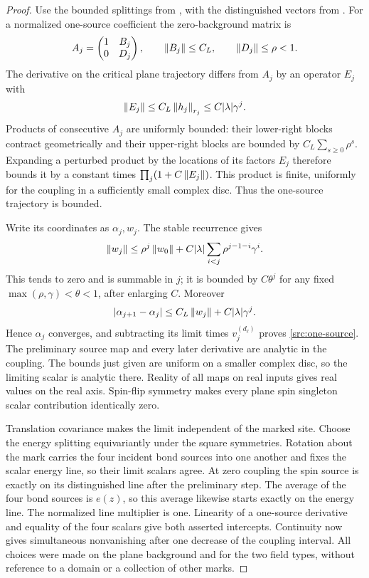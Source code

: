 \begin{proof}
Use the bounded splittings from , with the distinguished
vectors from . For a normalized one-source coefficient the
zero-background matrix is
\[
 A_j=
 \begin{pmatrix}1&B_j\\0&D_j\end{pmatrix},
 \qquad \left\|B_j\right\|\leq C_L,
 \qquad \left\|D_j\right\|\leq\rho<1.
\]
The derivative on the critical plane trajectory differs from $A_j$ by an
operator $E_j$ with
\[
 \left\|E_j\right\|\leq C_L\left\|h_j\right\|_{r_j}
                  \leq C|\lambda|\gamma^j.
\]
Products of consecutive $A_j$ are uniformly bounded: their lower-right
blocks contract geometrically and their upper-right blocks are bounded
by $C_L\sum_{s\geq0}\rho^s$. Expanding a perturbed product by the locations
of its factors $E_j$ therefore bounds it by a constant times
$\prod_j(1+C\left\|E_j\right\|)$. This product is finite, uniformly for the
coupling in a sufficiently small complex disc. Thus the one-source
trajectory is bounded.

Write its coordinates as $\alpha_j,w_j$. The stable recurrence gives
\[
 \left\|w_j\right\|
 \leq \rho^j\left\|w_0\right\|
       +C|\lambda|\sum_{i<j}\rho^{j-1-i}\gamma^i.
\]
This tends to zero and is summable in $j$; it is bounded by $C\theta^j$
for any fixed $\max(\rho,\gamma)<\theta<1$, after enlarging $C$.
Moreover
\[
 |\alpha_{j+1}-\alpha_j|
 \leq C_L\left\|w_j\right\|+C|\lambda|\gamma^j.
\]
Hence $\alpha_j$ converges, and subtracting its limit times
$v_j^{(d_\ell)}$ proves \eqref{src:one-source}. The preliminary source
map and every later derivative are analytic in the coupling. The bounds
just given are uniform on a smaller complex disc, so the limiting scalar
is analytic there. Reality of all maps on real inputs gives real values
on the real axis. Spin-flip symmetry makes every plane spin singleton
scalar contribution identically zero.

Translation covariance makes the limit independent of the marked site.
Choose the energy splitting equivariantly under the square symmetries.
Rotation about the mark carries the four incident bond sources into one
another and fixes the scalar energy line, so their limit scalars agree.
At zero coupling the spin source is exactly on its distinguished line
after the preliminary step. The average of the four bond sources is
$e(z)$, so this average likewise starts exactly on the energy line.
The normalized line multiplier is one. Linearity of a one-source
derivative and equality of the four scalars give both asserted
intercepts. Continuity now gives simultaneous nonvanishing after one
decrease of the coupling interval. All choices were made on the plane
background and for the two field types, without reference to a domain
or a collection of other marks.
\end{proof}

